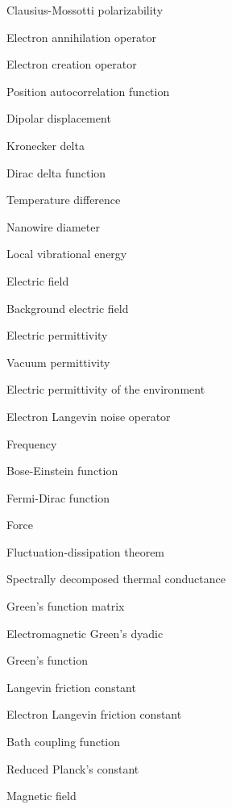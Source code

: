 \documentclass[dissertation]{aaltoseries}
\begin{document}
\begin{description} \itemsep2pt
  \item[$\alpha^{\textrm{CM}}$] Clausius-Mossotti polarizability
  \item[$c$] Electron annihilation operator 
  \item[$c^{\dagger}$] Electron creation operator 
  \item[$C$] Position autocorrelation function
  \item[$d$] Dipolar displacement 
  \item[$\delta_{ij}$] Kronecker delta
   \item[$\delta(x-x')$] Dirac delta function
  \item[$\Delta T$] Temperature difference
  \item[$D$] Nanowire diameter
    \item[$e$] Local vibrational energy
   \item[$E$] Electric field  
   \item[$E_{\textrm{env}}$] Background electric field
   \item[$\varepsilon$] Electric permittivity
   \item[$\varepsilon_0$] Vacuum permittivity
   \item[$\varepsilon_{\textrm{env}}$] Electric permittivity of the environment
   \item[$\eta$] Electron Langevin noise operator
   \item[$f$] Frequency
   \item[$f_{\textrm{BE}}$] Bose-Einstein function
   \item[$f_{\textrm{FD}}$] Fermi-Dirac function
  \item[$F$] Force
   \item[FDT] Fluctuation-dissipation theorem
  \item[$g$] Spectrally decomposed thermal conductance
  \item[$G$] Green's function matrix
  \item[$\mathbb{G}$] Electromagnetic Green's dyadic
  \item[GF] Green's function 
  \item[$\gamma$] Langevin friction constant
  \item[$\gamma_e$] Electron Langevin friction constant
  \item[$\Gamma$] Bath coupling function
  \item[$\hbar$] Reduced Planck's constant
  \item[$H$] Magnetic field 

\end{description}
\end{document}
